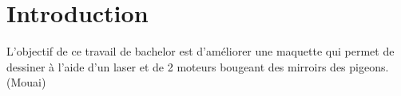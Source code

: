 \section{Introduction}
L'objectif de ce travail de bachelor est d'améliorer une maquette qui permet de dessiner à l'aide d'un laser et de 2 moteurs bougeant des mirroirs des pigeons. (Mouai)



